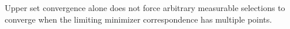 Upper set convergence alone does not force arbitrary measurable selections to converge when the limiting minimizer correspondence has multiple points.